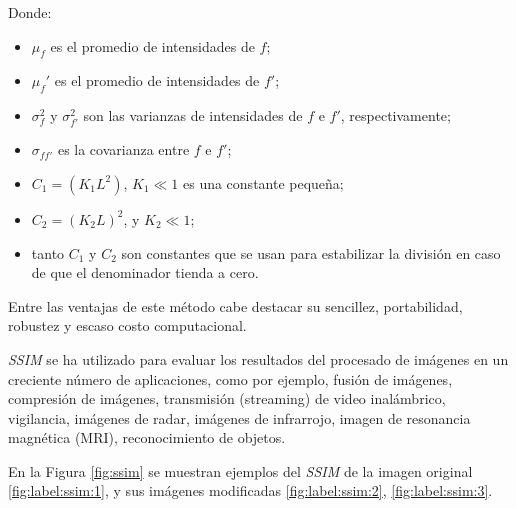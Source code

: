 Donde:
\begin{itemize}
\item $\mu_f$ es el promedio de intensidades de $f$;
\item $\mu_f'$ es el promedio de intensidades de $f'$; 
\item $\sigma_f^2$ y $\sigma_{f'}^2$ son las varianzas de intensidades de $f$ e $f'$, respectivamente;
\item $\sigma_{ff'}$ es la covarianza entre $f$ e $f'$;
\item $C_1=(K_1L^2)$, $K_1 \ll 1$ es una constante pequeña;
\item $C_2=(K_2 L)^2$, y $K_2 \ll 1$;
\item tanto $C_1$ y $C_2$ son constantes que se usan para estabilizar la división en caso de que el denominador tienda a cero.
\end{itemize}


Entre las ventajas de este método cabe destacar su sencillez, portabilidad, robustez y escaso costo computacional. 

\textit{SSIM} se ha utilizado para evaluar los resultados del procesado de imágenes en un creciente número de aplicaciones, como por ejemplo, fusión de imágenes, compresión de imágenes, transmisión (streaming) de video inalámbrico, vigilancia, imágenes de radar, imágenes de infrarrojo, imagen de resonancia magnética (MRI), reconocimiento de objetos.


En la Figura \ref{fig:ssim} se muestran ejemplos del \textit{SSIM} de la imagen original \ref{fig:label:ssim:1}, y sus imágenes modificadas \ref{fig:label:ssim:2}, \ref{fig:label:ssim:3}.

